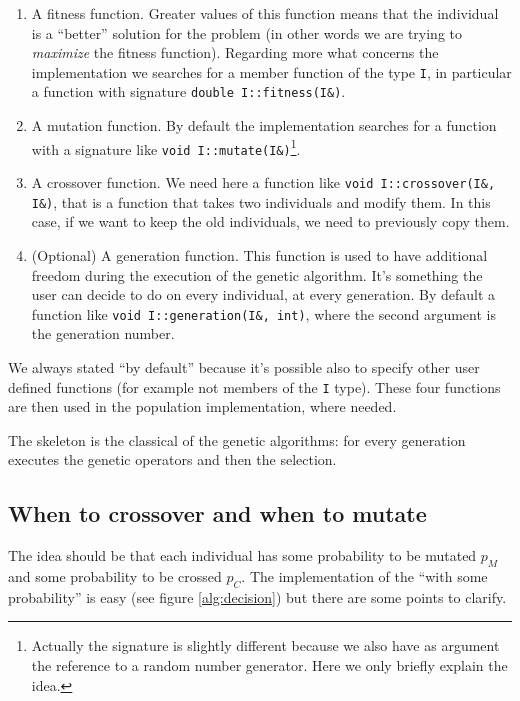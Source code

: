 \documentclass{report}
\begin{document}
\begin{enumerate}
\item A fitness function. Greater values of this function means that the individual is a ``better'' solution for the problem (in other words we are trying to \textit{maximize} the fitness function). Regarding more what concerns the implementation we searches for a member function of the type \texttt{I}, in particular a function with signature \texttt{double I::fitness(I\&)}.

\item A mutation function. By default the implementation searches for a function with a signature like \texttt{void I::mutate(I\&)}\footnote{Actually the signature is slightly different because we also have as argument the reference to a random number generator. Here we only briefly explain the idea.}.

\item A crossover function. We need here a function like \texttt{void I::crossover(I\&, I\&)}, that is a function that takes two individuals and modify them. In this case, if we want to keep the old individuals, we need to previously copy them.

\item (Optional) A generation function. This function is used to have additional freedom during the execution of the genetic algorithm. It's something the user can decide to do on every individual, at every generation. By default a function like \texttt{void I::generation(I\&, int)}, where the second argument is the generation number.
\end{enumerate}

We always stated ``by default'' because it's possible also to specify other user defined functions (for example not members of the \texttt{I} type). These four functions are then used in the population implementation, where needed.

The skeleton is the classical of the genetic algorithms: for every generation executes the genetic operators and then the selection.

\subsection{When to crossover and when to mutate}

The idea should be that each individual has some probability to be mutated $p_M$ and some probability to be crossed $p_C$. The implementation of the ``with some probability'' is easy (see figure \ref{alg:decision}) but there are some points to clarify.
\end{document}

